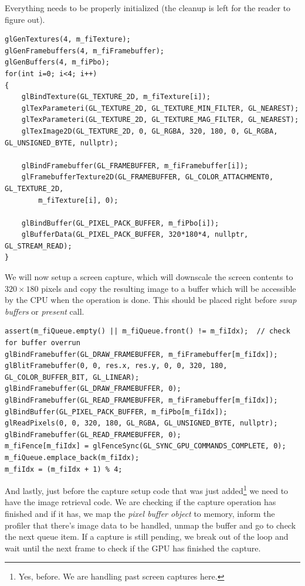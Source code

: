 \documentclass[hidelinks,titlepage,a4paper]{article}
\begin{document}
Everything needs to be properly initialized (the cleanup is left for the reader to figure out).

\begin{lstlisting}
glGenTextures(4, m_fiTexture);
glGenFramebuffers(4, m_fiFramebuffer);
glGenBuffers(4, m_fiPbo);
for(int i=0; i<4; i++)
{
    glBindTexture(GL_TEXTURE_2D, m_fiTexture[i]);
    glTexParameteri(GL_TEXTURE_2D, GL_TEXTURE_MIN_FILTER, GL_NEAREST);
    glTexParameteri(GL_TEXTURE_2D, GL_TEXTURE_MAG_FILTER, GL_NEAREST);
    glTexImage2D(GL_TEXTURE_2D, 0, GL_RGBA, 320, 180, 0, GL_RGBA, GL_UNSIGNED_BYTE, nullptr);

    glBindFramebuffer(GL_FRAMEBUFFER, m_fiFramebuffer[i]);
    glFramebufferTexture2D(GL_FRAMEBUFFER, GL_COLOR_ATTACHMENT0, GL_TEXTURE_2D,
		m_fiTexture[i], 0);

    glBindBuffer(GL_PIXEL_PACK_BUFFER, m_fiPbo[i]);
    glBufferData(GL_PIXEL_PACK_BUFFER, 320*180*4, nullptr, GL_STREAM_READ);
}
\end{lstlisting}

We will now setup a screen capture, which will downscale the screen contents to $320\times180$ pixels and copy the resulting image to a buffer which will be accessible by the CPU when the operation is done. This should be placed right before \emph{swap buffers} or \emph{present} call.

\begin{lstlisting}
assert(m_fiQueue.empty() || m_fiQueue.front() != m_fiIdx);	// check for buffer overrun
glBindFramebuffer(GL_DRAW_FRAMEBUFFER, m_fiFramebuffer[m_fiIdx]);
glBlitFramebuffer(0, 0, res.x, res.y, 0, 0, 320, 180, GL_COLOR_BUFFER_BIT, GL_LINEAR);
glBindFramebuffer(GL_DRAW_FRAMEBUFFER, 0);
glBindFramebuffer(GL_READ_FRAMEBUFFER, m_fiFramebuffer[m_fiIdx]);
glBindBuffer(GL_PIXEL_PACK_BUFFER, m_fiPbo[m_fiIdx]);
glReadPixels(0, 0, 320, 180, GL_RGBA, GL_UNSIGNED_BYTE, nullptr);
glBindFramebuffer(GL_READ_FRAMEBUFFER, 0);
m_fiFence[m_fiIdx] = glFenceSync(GL_SYNC_GPU_COMMANDS_COMPLETE, 0);
m_fiQueue.emplace_back(m_fiIdx);
m_fiIdx = (m_fiIdx + 1) % 4;
\end{lstlisting}

And lastly, just before the capture setup code that was just added\footnote{Yes, before. We are handling past screen captures here.} we need to have the image retrieval code. We are checking if the capture operation has finished and if it has, we map the \emph{pixel buffer object} to memory, inform the profiler that there's image data to be handled, unmap the buffer and go to check the next queue item. If a capture is still pending, we break out of the loop and wait until the next frame to check if the GPU has finished the capture.
\end{document}
